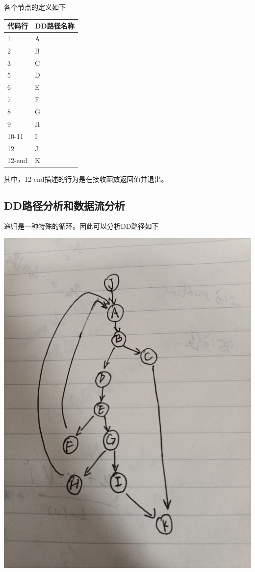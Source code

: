 \documentclass[12pt, a4paper, oneside]{ctexart}
\begin{document}
各个节点的定义如下

\newpage
\begin{table}[!h]
    \begin{tabular}{|l|l|}
    \hline
    代码行 & DD路径名称\\ \hline
    1 & A\\ \hline
    2 & B\\ \hline
    3 & C \\ \hline
    5 & D \\ \hline
    6 & E \\ \hline
    7 & F \\ \hline
    8 & G \\ \hline
    9 & H \\ \hline
    10-11 & I \\ \hline
    12 & J \\ \hline
    12-end & K \\ \hline
    \end{tabular}
\end{table}

其中，12-end描述的行为是在接收函数返回值并退出。

\subsection{DD路径分析和数据流分析}

递归是一种特殊的循环。因此可以分析DD路径如下

\includegraphics[scale=0.2]{screenshots/DD-search.jpg}
\end{document}
